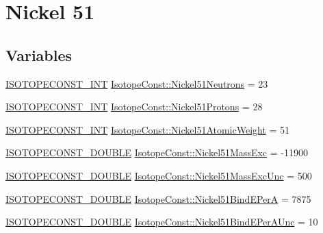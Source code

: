 \hypertarget{group___isotope_const-_nickel-_ni51}{}\section{Nickel 51}
\label{group___isotope_const-_nickel-_ni51}
\subsection*{Variables}
\begin{DoxyCompactItemize}
\item 
\mbox{\hyperlink{group___isotope_const-_macros_ga5f18360b3e99483a35c32d789e62621c}{I\+S\+O\+T\+O\+P\+E\+C\+O\+N\+S\+T\+\_\+\+I\+NT}} \mbox{\hyperlink{group___isotope_const-_nickel-_ni51_ga587b63f9389c5b5a2c7ac3cc1570bc63}{Isotope\+Const\+::\+Nickel51\+Neutrons}} = 23
\item 
\mbox{\hyperlink{group___isotope_const-_macros_ga5f18360b3e99483a35c32d789e62621c}{I\+S\+O\+T\+O\+P\+E\+C\+O\+N\+S\+T\+\_\+\+I\+NT}} \mbox{\hyperlink{group___isotope_const-_nickel-_ni51_ga8dc4044d5b750018dbf3ff73cb711746}{Isotope\+Const\+::\+Nickel51\+Protons}} = 28
\item 
\mbox{\hyperlink{group___isotope_const-_macros_ga5f18360b3e99483a35c32d789e62621c}{I\+S\+O\+T\+O\+P\+E\+C\+O\+N\+S\+T\+\_\+\+I\+NT}} \mbox{\hyperlink{group___isotope_const-_nickel-_ni51_ga63a63c923e421df8ff40fb9c1c5acc86}{Isotope\+Const\+::\+Nickel51\+Atomic\+Weight}} = 51
\item 
\mbox{\hyperlink{group___isotope_const-_macros_ga8f45a7272ce02c0b4c65c44636ed719a}{I\+S\+O\+T\+O\+P\+E\+C\+O\+N\+S\+T\+\_\+\+D\+O\+U\+B\+LE}} \mbox{\hyperlink{group___isotope_const-_nickel-_ni51_ga6fe5efa09f28078c9e81e10a0543f238}{Isotope\+Const\+::\+Nickel51\+Mass\+Exc}} = -\/11900
\item 
\mbox{\hyperlink{group___isotope_const-_macros_ga8f45a7272ce02c0b4c65c44636ed719a}{I\+S\+O\+T\+O\+P\+E\+C\+O\+N\+S\+T\+\_\+\+D\+O\+U\+B\+LE}} \mbox{\hyperlink{group___isotope_const-_nickel-_ni51_ga2a1a644afb9d0e0804e81429623abec7}{Isotope\+Const\+::\+Nickel51\+Mass\+Exc\+Unc}} = 500
\item 
\mbox{\hyperlink{group___isotope_const-_macros_ga8f45a7272ce02c0b4c65c44636ed719a}{I\+S\+O\+T\+O\+P\+E\+C\+O\+N\+S\+T\+\_\+\+D\+O\+U\+B\+LE}} \mbox{\hyperlink{group___isotope_const-_nickel-_ni51_ga0fccc07413975549e5bc7c3e219dc9da}{Isotope\+Const\+::\+Nickel51\+Bind\+E\+PerA}} = 7875
\item 
\mbox{\hyperlink{group___isotope_const-_macros_ga8f45a7272ce02c0b4c65c44636ed719a}{I\+S\+O\+T\+O\+P\+E\+C\+O\+N\+S\+T\+\_\+\+D\+O\+U\+B\+LE}} \mbox{\hyperlink{group___isotope_const-_nickel-_ni51_gad6f0fc752ab03315d8477432b42b6263}{Isotope\+Const\+::\+Nickel51\+Bind\+E\+Per\+A\+Unc}} = 10

\end{DoxyCompactItemize}
